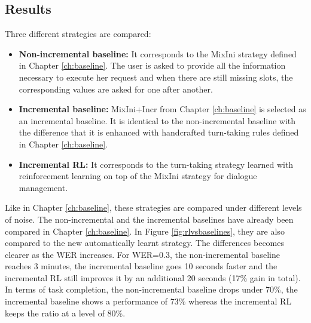 \begin{figure*}[htp]
\begin{minipage}{.47\textwidth}
\end{minipage}
\caption{Mean dialogue duration and task for the non-incremental, the baseline incremental and the RL incremental (after convergence) strategies under different noise conditions.}
\label{fig:rlvsbaselines}
\end{figure*}
   
   	\subsection{Results}
    
    	Three different strategies are compared:
        \begin{itemize}
        	\item \textbf{Non-incremental baseline:} It corresponds to the MixIni strategy defined in Chapter \ref{ch:baseline}. The user is asked to provide all the information necessary to execute her request and when there are still missing slots, the corresponding values are asked for one after another.
            \item \textbf{Incremental baseline:} MixIni+Incr from Chapter \ref{ch:baseline} is selected as an incremental baseline. It is identical to the non-incremental baseline with the difference that it is enhanced with handcrafted turn-taking rules defined in Chapter \ref{ch:baseline}.
            \item \textbf{Incremental RL:} It corresponds to the turn-taking strategy learned with reinforcement learning on top of the MixIni strategy for dialogue management.
        \end{itemize}
        
        Like in Chapter \ref{ch:baseline}, these strategies are compared under different levels of noise. The non-incremental and the incremental baselines have already been compared in Chapter \ref{ch:baseline}. In Figure \ref{fig:rlvsbaselines}, they are also compared to the new automatically learnt strategy. The differences becomes clearer as the WER increases. For WER=0.3, the non-incremental baseline reaches 3 minutes, the incremental baseline goes 10 seconds faster and the incremental RL still improves it by an additional 20 seconds (17\% gain in total). In terms of task completion, the non-incremental baseline drops under 70\%, the incremental baseline shows a performance of 73\% whereas the incremental RL keeps the ratio at a level of 80\%.
